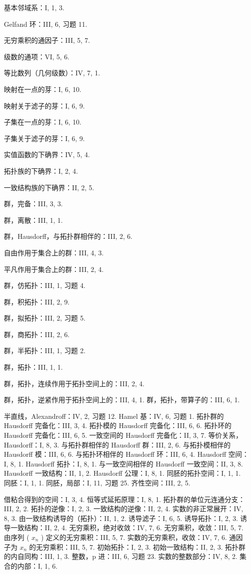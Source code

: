 基本邻域系：I, 1, 3.

Gelfand 环：III, 6, 习题 11.

无穷乘积的通因子：III, 5, 7.

级数的通项：VI, 5, 6.

等比数列（几何级数）：IV, 7, 1.

映射在一点的芽：I, 6, 10.

映射关于滤子的芽：I, 6, 9.

子集在一点的芽：I, 6, 10.

子集关于滤子的芽：I, 6, 9.

实值函数的下确界：IV, 5, 4.

拓扑族的下确界：I, 2, 4.

一致结构族的下确界：II, 2, 5.

群，完备：III, 3, 3.

群，离散：III, 1, 1.

群，Hausdorff，与拓扑群相伴的：III, 2, 6.

自由作用于集合上的群：III, 4, 3.

平凡作用于集合上的群：III, 2, 4.

群，仿拓扑：III, 1, 习题 4.

群，积拓扑：III, 2, 9.

群，拟拓扑：III, 2, 习题 5.

群，商拓扑：III, 2, 6.

群，半拓扑：III, 1, 习题 2.

群，拓扑：III, 1, 1.

群，拓扑，连续作用于拓扑空间上的：III, 2, 4.

群，拓扑，逆紧作用于拓扑空间上的：III, 4, 1. 群，拓扑，带算子的：III, 6, 1.

半直线，Alexandroff：IV, 2, 习题 12. Hamel 基：IV, 6, 习题 1. 拓扑群的 Hausdorff 完备化：III, 3, 4. 拓扑模的 Hausdorff 完备化：III, 6, 6. 拓扑环的 Hausdorff 完备化：III, 6, 5. 一致空间的 Hausdorff 完备化：II, 3, 7. 等价关系，Hausdorff：I, 8, 3. 与拓扑群相伴的 Hausdorff 群：III, 2, 6. 与拓扑模相伴的 Hausdorff 模：III, 6, 6. 与拓扑环相伴的 Hausdorff 环：III, 6, 4. Hausdorff 空间：I, 8, 1. Hausdorff 拓扑：I, 8, 1. 与一致空间相伴的 Hausdorff 一致空间：II, 3, 8. Hausdorff 一致结构：II, 1, 2. Hausdorff 公理：I, 8, 1. 同胚的拓扑空间：I, 1, 1. 同胚：I, 1, 1. 同胚，局部：I, 11, 习题 25. 齐性空间：III, 2, 5.

借粘合得到的空间：I, 3, 4. 恒等式延拓原理：I, 8, 1. 拓扑群的单位元连通分支：III, 2, 2. 拓扑的逆像：I, 2, 3. 一致结构的逆像：II, 2, 4. 实数的非正常展开：IV, 8, 3. 由一致结构诱导的（拓扑）：II, 1, 2. 诱导滤子：I, 6, 5. 诱导拓扑：I, 2, 3. 诱导一致结构：II, 2, 4. 无穷乘积，绝对收敛：IV, 7, 6. 无穷乘积，收敛：III, 5, 7. 由序列 ( \(x_n\) ) 定义的无穷乘积：III, 5, 7. 实数的无穷乘积，收敛：IV, 7, 6. 通因子为 \(x_n\) 的无穷乘积：III, 5, 7. 初始拓扑：I, 2, 3. 初始一致结构：II, 2, 3. 拓扑群的内自同构：III, 1, 3. 整数，p 进：III, 6, 习题 23. 实数的整数部分：IV, 8, 2. 集合的内部：I, 1, 6.

